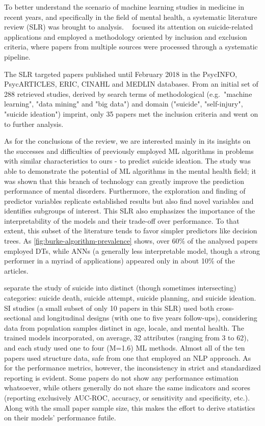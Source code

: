 To better understand the scenario of machine learning studies in medicine in recent years, and specifically in the field of mental health, a systematic literature review (SLR) was brought to analysis.
~\citet{Burke2019} focused its attention on suicide-related applications and employed a methodology oriented by inclusion and exclusion criteria, where papers from multiple sources were processed through a systematic pipeline.

The SLR targeted papers published until February 2018 in the PsycINFO, PsycARTICLES, ERIC, CINAHL and MEDLIN databases.
From an initial set of 288 retrieved studies, derived by search terms of methodological (e.g.\ "machine learning", "data mining" and "big data") and domain ("suicide", "self-injury", "suicide ideation") imprint, only 35 papers met the inclusion criteria and went on to further analysis.

As for the conclusions of the review, we are interested mainly in its insights on the successes and difficulties of previously employed ML algorithms in problems with similar characteristics to ours - to predict suicide ideation.
The study was able to demonstrate the potential of ML algorithms in the mental health field;
it was shown that this branch of technology can greatly improve the prediction performance of mental disorders.
Furthermore, the exploration and finding of predictor variables replicate established results but also find novel variables and identifies subgroups of interest.
This SLR also emphasizes the importance of the interpretability of the models and their trade-off over performance.
To that extent, this subset of the literature tends to favor simpler predictors like decision trees.
As \autoref{fig:burke-algorithm-prevalence} shows, over 60\% of the analysed papers employed DTs, while ANNs (a generally less interpretable model, though a strong performer in a myriad of applications) appeared only in about 10\% of the articles.

\citet{Burke2019} separate the study of suicide into distinct (though sometimes intersecting) categories: suicide death, suicide attempt, suicide planning, and suicide ideation.
SI studies (a small subset of only 10 papers in this SLR) used both cross-sectional and longitudinal designs (with one to five years follow-ups), considering data from population samples distinct in age, locale, and mental health.
The trained models incorporated, on average, 32 attributes (ranging from 3 to 62), and each study used one to four (M=1.6) ML methods.
Almost all of the ten papers used structure data, safe from one that employed an NLP approach.
As for the performance metrics, however, the inconsistency in strict and standardized reporting is evident.
Some papers do not show any performance estimation whatsoever, while others generally do not share the same indicators and scores (reporting exclusively AUC-ROC, accuracy, or sensitivity and specificity, etc.).
Along with the small paper sample size, this makes the effort to derive statistics on their models' performance futile.

